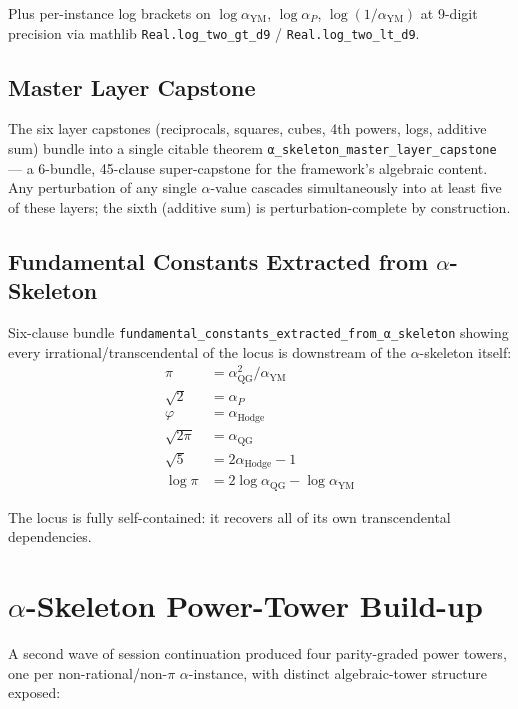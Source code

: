 Plus per-instance log brackets on $\log \alpha_{\text{YM}}$,
$\log \alpha_P$, $\log(1/\alpha_{\text{YM}})$ at 9-digit precision
via mathlib \verb|Real.log_two_gt_d9| / \verb|Real.log_two_lt_d9|.

\subsection{Master Layer Capstone}

The six layer capstones (reciprocals, squares, cubes, 4th powers,
logs, additive sum) bundle into a single citable theorem
\verb|α_skeleton_master_layer_capstone| --- a 6-bundle, 45-clause
super-capstone for the framework's algebraic content. Any perturbation
of any single $\alpha$-value cascades simultaneously into at least
five of these layers; the sixth (additive sum) is perturbation-complete
by construction.

\subsection{Fundamental Constants Extracted from \texorpdfstring{$\alpha$}{alpha}-Skeleton}

Six-clause bundle
\verb|fundamental_constants_extracted_from_α_skeleton| showing every
irrational/transcendental of the locus is downstream of the
$\alpha$-skeleton itself:
\begin{align*}
\pi &= \alpha_{\text{QG}}^2 / \alpha_{\text{YM}} \\
\sqrt{2} &= \alpha_P \\
\varphi &= \alpha_{\text{Hodge}} \\
\sqrt{2\pi} &= \alpha_{\text{QG}} \\
\sqrt{5} &= 2 \alpha_{\text{Hodge}} - 1 \\
\log \pi &= 2 \log \alpha_{\text{QG}} - \log \alpha_{\text{YM}}
\end{align*}

The locus is fully self-contained: it recovers all of its own
transcendental dependencies.

\section{\texorpdfstring{$\alpha$}{alpha}-Skeleton Power-Tower Build-up}
\label{sec:power-towers-2026-06-16}

A second wave of session continuation produced four parity-graded
power towers, one per non-rational/non-$\pi$ $\alpha$-instance, with
distinct algebraic-tower structure exposed:

